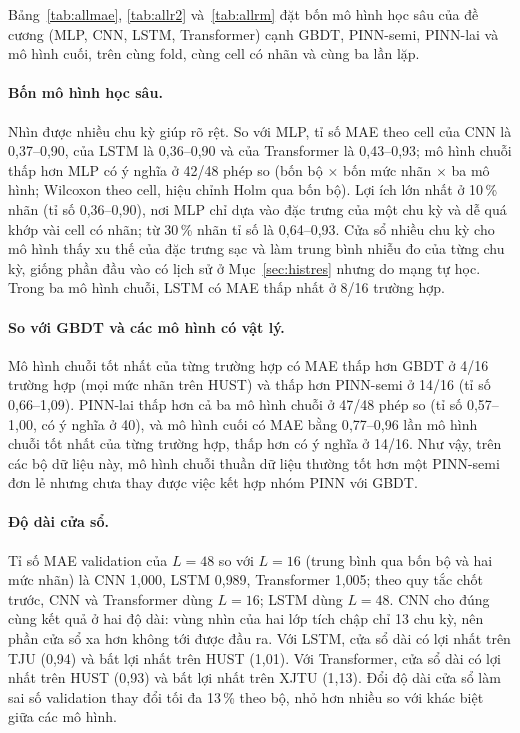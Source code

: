 \documentclass[12pt,a4paper,oneside]{report}
\theoremstyle{plain}
\theoremstyle{definition}
\begin{document}
Bảng~\ref{tab:allmae}, \ref{tab:allr2} và~\ref{tab:allrm} đặt bốn mô hình học sâu của đề cương (MLP, CNN,
LSTM, Transformer) cạnh GBDT, PINN-semi, PINN-lai và mô hình cuối, trên cùng fold, cùng cell có nhãn và cùng ba lần lặp.

\paragraph{Bốn mô hình học sâu.} Nhìn được nhiều chu kỳ giúp rõ rệt. So với MLP, tỉ số MAE theo cell của CNN là 0{,}37--0{,}90, của LSTM là 0{,}36--0{,}90 và của Transformer là 0{,}43--0{,}93;
mô hình chuỗi thấp hơn MLP có ý nghĩa ở 42/48 phép so (bốn bộ $\times$ bốn mức nhãn $\times$ ba mô hình;
Wilcoxon theo cell, hiệu chỉnh Holm qua bốn bộ). Lợi ích lớn nhất ở 10\,\% nhãn
(tỉ số 0{,}36--0{,}90), nơi MLP chỉ dựa vào đặc trưng của một chu kỳ và dễ quá khớp vài cell có nhãn; từ 30\,\% nhãn tỉ số là
0{,}64--0{,}93. Cửa sổ nhiều chu kỳ cho mô hình thấy xu thế của đặc trưng sạc và làm trung bình nhiễu đo của từng chu kỳ,
giống phần đầu vào có lịch sử ở Mục~\ref{sec:histres} nhưng do mạng tự học. Trong ba mô hình chuỗi, LSTM có MAE thấp
nhất ở 8/16 trường hợp.

\paragraph{So với GBDT và các mô hình có vật lý.} Mô hình chuỗi tốt nhất của từng trường hợp có MAE thấp hơn GBDT ở
4/16 trường hợp (mọi mức nhãn trên HUST) và thấp hơn PINN-semi ở 14/16 (tỉ số 0{,}66--1{,}09). PINN-lai thấp hơn cả ba mô hình chuỗi
ở 47/48 phép so (tỉ số 0{,}57--1{,}00, có ý nghĩa ở 40), và mô hình cuối có MAE bằng 0{,}77--0{,}96 lần mô hình chuỗi
tốt nhất của từng trường hợp, thấp hơn có ý nghĩa ở 14/16. Như vậy, trên các bộ dữ liệu này, mô hình chuỗi
thuần dữ liệu thường tốt hơn một PINN-semi đơn lẻ nhưng chưa thay được việc kết hợp nhóm PINN với GBDT.

\paragraph{Độ dài cửa sổ.} Tỉ số MAE validation của $L = 48$ so với $L = 16$ (trung bình qua bốn bộ và hai mức nhãn) là CNN 1{,}000, LSTM 0{,}989, Transformer 1{,}005; theo quy tắc chốt trước, CNN và Transformer dùng $L = 16$; LSTM dùng $L = 48$. CNN cho đúng cùng kết quả ở hai độ dài: vùng nhìn của hai lớp tích chập chỉ 13 chu kỳ, nên phần cửa sổ xa hơn không tới được đầu ra. Với LSTM, cửa sổ dài có lợi nhất trên TJU (0{,}94) và bất lợi nhất trên HUST (1{,}01). Với Transformer, cửa sổ dài có lợi nhất trên HUST (0{,}93) và bất lợi nhất trên XJTU (1{,}13). Đổi độ dài cửa sổ làm sai số validation thay đổi tối đa 13\,\% theo bộ, nhỏ hơn nhiều so với khác biệt giữa các mô hình.
\end{document}
